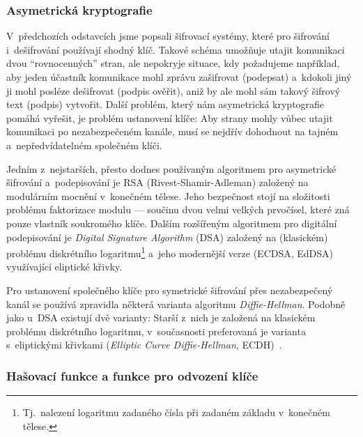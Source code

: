 \subsubsection*{Asymetrická kryptografie}

V~předchozích odstavcích jsme popsali šifrovací systémy, které pro šifrování i~dešifrování používají shodný klíč. Takové schéma umožňuje utajit komunikaci dvou ``rovnocenných'' stran, ale nepokryje situace, kdy požadujeme například, aby jeden účastník komunikace mohl zprávu zašifrovat (podepsat) a~kdokoli jiný ji mohl posléze dešifrovat (podpis ověřit), aniž by ale mohl sám takový šifrový text (podpis) vytvořit. Další problém, který nám asymetrická kryptografie pomáhá vyřešit, je problém ustanovení klíče: Aby strany mohly vůbec utajit komunikaci po ne\-za\-bez\-pe\-če\-ném kanále, musí se nejdřív dohodnout na tajném a~ne\-před\-ví\-da\-tel\-ném společném klíči.

Jedním z~nejstarších, přesto dodnes používaným algoritmem pro asymetrické šifrování a~podepisování je RSA (Rivest-Shamir-Adleman) založený na modulárním mocnění v~konečném tělese. Jeho bezpečnost stojí na složitosti problému faktorizace modulu --- součinu dvou velmi velkých prvočísel, které zná pouze vlastník soukromého klíče. Dalším rozšířeným algoritmem pro digitální podepisování je \emph{Digital Signature Algorithm} (DSA) založený na (klasickém) problému diskrétního logaritmu\footnote{Tj.~nalezení logaritmu zadaného čísla při zadaném základu v~konečném tělese.} a~jeho modernější verze (ECDSA, EdDSA) využívající eliptické křivky.

Pro ustanovení společného klíče pro symetrické šifrování přes nezabezpečený kanál se používá zpravidla některá varianta algoritmu \emph{Diffie-Hellman}. Podobně jako u~DSA existují dvě varianty: Starší z~nich je založená na klasickém problému diskrétního logaritmu, v~současnosti preferovaná je varianta s~eliptickými křivkami (\textit{Elliptic Curve Diffie-Hellman}, ECDH)~\cite{haakegaard2015elliptic}.

\subsubsection*{Hašovací funkce a funkce pro odvození klíče}

